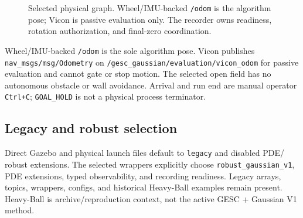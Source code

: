 \documentclass[
  10pt,
  letterpaper,
]{article}
\begin{document}
\begin{figure}[htbp]
{%
}
\caption{Selected physical graph. Wheel/IMU-backed \texttt{/odom} is the
algorithm pose; Vicon is passive evaluation only. The recorder owns readiness,
rotation authorization, and final-zero coordination.}
\label{fig:physical-architecture}
\end{figure}

Wheel/IMU-backed \nolinkurl{/odom} is the sole algorithm pose. Vicon publishes
\nolinkurl{nav\_msgs/msg/Odometry} on \nolinkurl{/gesc\_gaussian/evaluation/vicon\_odom} for passive
evaluation and cannot gate or stop motion. The selected open field has no
autonomous obstacle or wall avoidance. Arrival and run end are manual
operator \nolinkurl{Ctrl+C}; \nolinkurl{GOAL\_HOLD} is not a physical process terminator.

\subsection{Legacy and robust selection}\label{legacy-and-robust-selection}

Direct Gazebo and physical launch files default to \nolinkurl{legacy} and disabled PDE/
robust extensions. The selected wrappers explicitly choose
\nolinkurl{robust\_gaussian\_v1}, PDE extensions, typed observability, and recording
readiness. Legacy arrays, topics, wrappers, configs, and historical Heavy-Ball
examples remain present. Heavy-Ball is archive/reproduction context, not the
active GESC + Gaussian V1 method.
\end{document}
